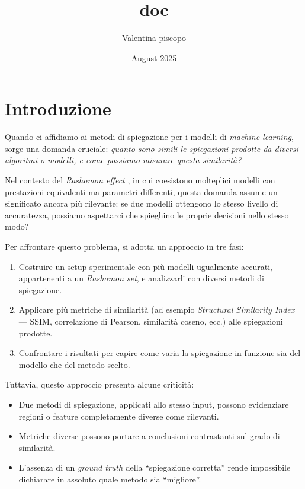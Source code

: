 \documentclass{article}
\title{doc}
\author{Valentina piscopo}
\date{August 2025}
\begin{document}
\maketitle

\tableofcontents
\newpage

\section{Introduzione}

Quando ci affidiamo ai metodi di spiegazione per i modelli di \emph{machine
      learning}, sorge una domanda cruciale: \textit{quanto sono simili le
      spiegazioni prodotte da diversi algoritmi o modelli, e come possiamo misurare
      questa similarità?}

Nel contesto del \emph{Rashomon effect}
\cite{mueller2023rashomon,leventi2023consistency}, in cui coesistono molteplici
modelli con prestazioni equivalenti ma parametri differenti, questa domanda
assume un significato ancora più rilevante: se due modelli ottengono lo stesso
livello di accuratezza, possiamo aspettarci che spieghino le proprie decisioni
nello stesso modo?

Per affrontare questo problema, si adotta un approccio in tre fasi:
\begin{enumerate}
      \item Costruire un setup sperimentale con più modelli ugualmente accurati,
            appartenenti a un \emph{Rashomon set}, e analizzarli con diversi metodi di
            spiegazione.
      \item Applicare più metriche di similarità (ad esempio \emph{Structural Similarity
                  Index} — SSIM, correlazione di Pearson, similarità coseno, ecc.) alle
            spiegazioni prodotte.
      \item Confrontare i risultati per capire come varia la spiegazione in funzione sia
            del modello che del metodo scelto.
\end{enumerate}

Tuttavia, questo approccio presenta alcune criticità:
\begin{itemize}
      \item Due metodi di spiegazione, applicati allo stesso input, possono evidenziare
            regioni o feature completamente diverse come rilevanti.
      \item Metriche diverse possono portare a conclusioni contrastanti sul grado di
            similarità.
      \item L’assenza di un \emph{ground truth} della “spiegazione corretta” rende
            impossibile dichiarare in assoluto quale metodo sia “migliore”.
\end{itemize}
\end{document}
